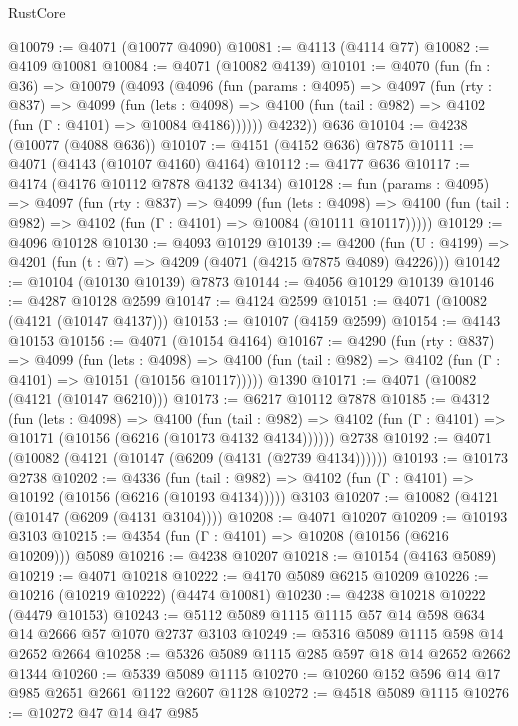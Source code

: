 \begin{lexlean}{RustCore}
\begin{coremodule}
@10079 := @4071 (@10077 @4090)
@10081 := @4113 (@4114 @77)
@10082 := @4109 @10081
@10084 := @4071 (@10082 @4139)
@10101 := @4070
    (fun (fn : @36) =>
    @10079
      (@4093
        (@4096
          (fun (params : @4095) =>
          @4097
            (fun (rty : @837) =>
            @4099
              (fun (lets : @4098) =>
              @4100 (fun (tail : @982) => @4102 (fun (Γ : @4101) => @10084 @4186))))))
        @4232))
    @636
@10104 := @4238 (@10077 (@4088 @636))
@10107 := @4151 (@4152 @636) @7875
@10111 := @4071 (@4143 (@10107 @4160) @4164)
@10112 := @4177 @636
@10117 := @4174 (@4176 @10112 @7878 @4132 @4134)
@10128 := fun (params : @4095) =>
  @4097
    (fun (rty : @837) =>
    @4099
      (fun (lets : @4098) =>
      @4100 (fun (tail : @982) => @4102 (fun (Γ : @4101) => @10084 (@10111 @10117)))))
@10129 := @4096 @10128
@10130 := @4093 @10129
@10139 := @4200 (fun (U : @4199) => @4201 (fun (t : @7) => @4209 (@4071 (@4215 @7875 @4089) @4226)))
@10142 := @10104 (@10130 @10139) @7873
@10144 := @4056 @10129 @10139
@10146 := @4287 @10128 @2599
@10147 := @4124 @2599
@10151 := @4071 (@10082 (@4121 (@10147 @4137)))
@10153 := @10107 (@4159 @2599)
@10154 := @4143 @10153
@10156 := @4071 (@10154 @4164)
@10167 := @4290
    (fun (rty : @837) =>
    @4099
      (fun (lets : @4098) =>
      @4100 (fun (tail : @982) => @4102 (fun (Γ : @4101) => @10151 (@10156 @10117)))))
    @1390
@10171 := @4071 (@10082 (@4121 (@10147 @6210)))
@10173 := @6217 @10112 @7878
@10185 := @4312
    (fun (lets : @4098) =>
    @4100
      (fun (tail : @982) =>
      @4102 (fun (Γ : @4101) => @10171 (@10156 (@6216 (@10173 @4132 @4134))))))
    @2738
@10192 := @4071 (@10082 (@4121 (@10147 (@6209 (@4131 (@2739 @4134))))))
@10193 := @10173 @2738
@10202 := @4336
    (fun (tail : @982) => @4102 (fun (Γ : @4101) => @10192 (@10156 (@6216 (@10193 @4134)))))
    @3103
@10207 := @10082 (@4121 (@10147 (@6209 (@4131 @3104))))
@10208 := @4071 @10207
@10209 := @10193 @3103
@10215 := @4354 (fun (Γ : @4101) => @10208 (@10156 (@6216 @10209))) @5089
@10216 := @4238 @10207
@10218 := @10154 (@4163 @5089)
@10219 := @4071 @10218
@10222 := @4170 @5089 @6215 @10209
@10226 := @10216 (@10219 @10222) (@4474 @10081)
@10230 := @4238 @10218 @10222 (@4479 @10153)
@10243 := @5112 @5089 @1115 @1115 @57 @14 @598 @634 @14 @2666 @57 @1070 @2737 @3103
@10249 := @5316 @5089 @1115 @598 @14 @2652 @2664
@10258 := @5326 @5089 @1115 @285 @597 @18 @14 @2652 @2662 @1344
@10260 := @5339 @5089 @1115
@10270 := @10260 @152 @596 @14 @17 @985 @2651 @2661 @1122 @2607 @1128
@10272 := @4518 @5089 @1115
@10276 := @10272 @47 @14 @47 @985

\end{coremodule}
\end{lexlean}

